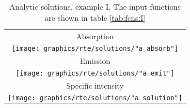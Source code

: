 \begin{table}[htdp]
\caption[Analytic solutions, example I]{Analytic solutions, example I. The input functions are shown in table \eqref{tab:fcns:I}}
\begin{center}
\begin{tabular}{c}
%
Absorption \\
\texttt{[image: graphics/rte/solutions/"a absorb"]} \\[10pt]
%
Emission \\
\texttt{[image: graphics/rte/solutions/"a emit"]} \\[10pt]
%
Specific intensity \\
\texttt{[image: graphics/rte/solutions/"a solution"]} \\
%
%
\end{tabular}
\end{center}
\label{rte:solutions I}
\end{table}%


\endinput %